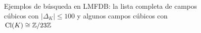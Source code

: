 \begin{figure}
  \begin{center}
    \setlength{\fboxsep}{1pt}
    \setlength{\fboxrule}{0.5pt}
  \end{center}
  
  \begin{center}
    \setlength{\fboxsep}{1pt}
    \setlength{\fboxrule}{0.5pt}
  \end{center}

  \caption{Ejemplos de búsqueda en LMFDB:
    la lista completa de campos cúbicos con $|\Delta_K| \le 100$ y
    algunos campos cúbicos con $\operatorname{Cl} (K) \cong \mathbb{Z}/23\mathbb{Z}$}
\end{figure}
\fi



